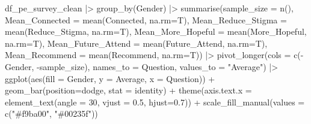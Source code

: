 \documentclass[
  letterpaper,
  DIV=11,
  numbers=noendperiod]{scrartcl}
\newenvironment{Shaded}{\begin{snugshade}}{\end{snugshade}}
\newcommand{\AttributeTok}[1]{\textcolor[rgb]{0.40,0.45,0.13}{#1}}
\newcommand{\DecValTok}[1]{\textcolor[rgb]{0.68,0.00,0.00}{#1}}
\newcommand{\FloatTok}[1]{\textcolor[rgb]{0.68,0.00,0.00}{#1}}
\newcommand{\FunctionTok}[1]{\textcolor[rgb]{0.28,0.35,0.67}{#1}}
\newcommand{\NormalTok}[1]{\textcolor[rgb]{0.00,0.23,0.31}{#1}}
\newcommand{\SpecialCharTok}[1]{\textcolor[rgb]{0.37,0.37,0.37}{#1}}
\newcommand{\StringTok}[1]{\textcolor[rgb]{0.13,0.47,0.30}{#1}}
\begin{document}
\begin{Shaded}
\begin{Highlighting}[]
\NormalTok{df\_pe\_survey\_clean }\SpecialCharTok{|\textgreater{}} 
  \FunctionTok{group\_by}\NormalTok{(Gender) }\SpecialCharTok{|\textgreater{}} 
  \FunctionTok{summarise}\NormalTok{(}\AttributeTok{sample\_size =} \FunctionTok{n}\NormalTok{(),}
            \AttributeTok{Mean\_Connected =} \FunctionTok{mean}\NormalTok{(Connected, }\AttributeTok{na.rm=}\NormalTok{T),}
            \AttributeTok{Mean\_Reduce\_Stigma =} \FunctionTok{mean}\NormalTok{(Reduce\_Stigma, }\AttributeTok{na.rm=}\NormalTok{T),}
            \AttributeTok{Mean\_More\_Hopeful =} \FunctionTok{mean}\NormalTok{(More\_Hopeful, }\AttributeTok{na.rm=}\NormalTok{T),}
            \AttributeTok{Mean\_Future\_Attend =} \FunctionTok{mean}\NormalTok{(Future\_Attend, }\AttributeTok{na.rm=}\NormalTok{T),}
            \AttributeTok{Mean\_Recommend =} \FunctionTok{mean}\NormalTok{(Recommend, }\AttributeTok{na.rm=}\NormalTok{T)) }\SpecialCharTok{|\textgreater{}} 
  \FunctionTok{pivot\_longer}\NormalTok{(}\AttributeTok{cols =} \FunctionTok{c}\NormalTok{(}\SpecialCharTok{{-}}\NormalTok{Gender, }\SpecialCharTok{{-}}\NormalTok{sample\_size),}
               \AttributeTok{names\_to =} \StringTok{\textquotesingle{}Question\textquotesingle{}}\NormalTok{,}
               \AttributeTok{values\_to =} \StringTok{"Average"}\NormalTok{) }\SpecialCharTok{|\textgreater{}} 
  \FunctionTok{ggplot}\NormalTok{(}\FunctionTok{aes}\NormalTok{(}\AttributeTok{fill =}\NormalTok{ Gender, }\AttributeTok{y =}\NormalTok{ Average, }\AttributeTok{x =}\NormalTok{ Question)) }\SpecialCharTok{+}
  \FunctionTok{geom\_bar}\NormalTok{(}\AttributeTok{position=}\StringTok{\textquotesingle{}dodge\textquotesingle{}}\NormalTok{, }\AttributeTok{stat =} \StringTok{\textquotesingle{}identity\textquotesingle{}}\NormalTok{) }\SpecialCharTok{+}
  \FunctionTok{theme}\NormalTok{(}\AttributeTok{axis.text.x =} \FunctionTok{element\_text}\NormalTok{(}\AttributeTok{angle =} \DecValTok{30}\NormalTok{, }\AttributeTok{vjust =} \FloatTok{0.5}\NormalTok{, }\AttributeTok{hjust=}\FloatTok{0.7}\NormalTok{)) }\SpecialCharTok{+}
  \FunctionTok{scale\_fill\_manual}\NormalTok{(}\AttributeTok{values =} \FunctionTok{c}\NormalTok{(}\StringTok{"\#f9ba00"}\NormalTok{,}
                               \StringTok{"\#00235f"}\NormalTok{))}
\end{Highlighting}
\end{Shaded}
\end{document}
